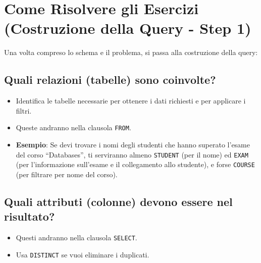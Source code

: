 \section{Come Risolvere gli Esercizi (Costruzione della Query - Step 1)}
Una volta compreso lo schema e il problema, si passa alla costruzione della query:

\subsection{Quali relazioni (tabelle) sono coinvolte?}
\begin{itemize}
    \item Identifica le tabelle necessarie per ottenere i dati richiesti e per applicare i filtri.
    \item Queste andranno nella clausola \texttt{FROM}.
    \item \textbf{Esempio}: Se devi trovare i nomi degli studenti che hanno superato l'esame del corso ``Databases'', ti serviranno almeno \texttt{STUDENT} (per il nome) ed \texttt{EXAM} (per l'informazione sull'esame e il collegamento allo studente), e forse \texttt{COURSE} (per filtrare per nome del corso).
\end{itemize}

\subsection{Quali attributi (colonne) devono essere nel risultato?}
\begin{itemize}
    \item Questi andranno nella clausola \texttt{SELECT}.
    \item Usa \texttt{DISTINCT} se vuoi eliminare i duplicati.
\end{itemize}

